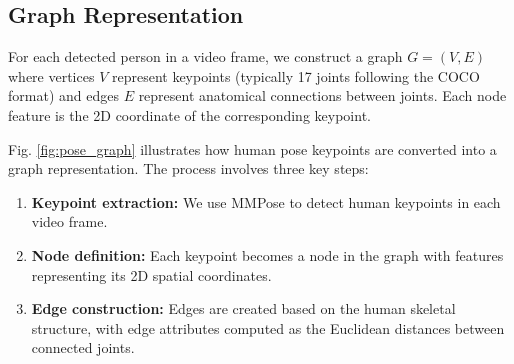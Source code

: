\documentclass[conference]{IEEEtran}
\begin{document}
\subsection{Graph Representation}
For each detected person in a video frame, we construct a graph $G = (V, E)$ where vertices $V$ represent keypoints (typically 17 joints following the COCO format) and edges $E$ represent anatomical connections between joints. Each node feature is the 2D coordinate of the corresponding keypoint.

Fig. \ref{fig:pose_graph} illustrates how human pose keypoints are converted into a graph representation. The process involves three key steps:

\begin{enumerate}
    \item \textbf{Keypoint extraction:} We use MMPose to detect human keypoints in each video frame.
    \item \textbf{Node definition:} Each keypoint becomes a node in the graph with features representing its 2D spatial coordinates.
    \item \textbf{Edge construction:} Edges are created based on the human skeletal structure, with edge attributes computed as the Euclidean distances between connected joints.
\end{enumerate}
\end{document}

